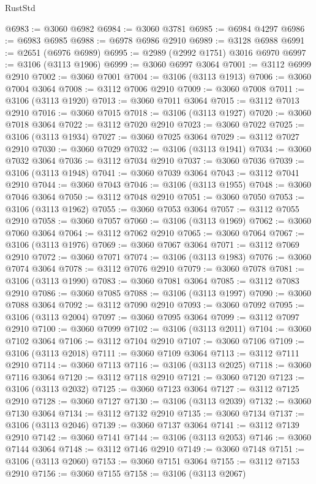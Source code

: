 \begin{lexlean}{RustStd}
\begin{coremodule}
@6983 := @3060 @6982
@6984 := @3060 @3781
@6985 := @6984 @4297
@6986 := @6983 @6985
@6988 := @6978 @6986 @2910
@6989 := @3128 @6988
@6991 := @2651 (@6976 @6989)
@6995 := @2989 (@2992 @1751) @3016 @6970
@6997 := @3106 (@3113 @1906)
@6999 := @3060 @6997 @3064
@7001 := @3112 @6999 @2910
@7002 := @3060 @7001
@7004 := @3106 (@3113 @1913)
@7006 := @3060 @7004 @3064
@7008 := @3112 @7006 @2910
@7009 := @3060 @7008
@7011 := @3106 (@3113 @1920)
@7013 := @3060 @7011 @3064
@7015 := @3112 @7013 @2910
@7016 := @3060 @7015
@7018 := @3106 (@3113 @1927)
@7020 := @3060 @7018 @3064
@7022 := @3112 @7020 @2910
@7023 := @3060 @7022
@7025 := @3106 (@3113 @1934)
@7027 := @3060 @7025 @3064
@7029 := @3112 @7027 @2910
@7030 := @3060 @7029
@7032 := @3106 (@3113 @1941)
@7034 := @3060 @7032 @3064
@7036 := @3112 @7034 @2910
@7037 := @3060 @7036
@7039 := @3106 (@3113 @1948)
@7041 := @3060 @7039 @3064
@7043 := @3112 @7041 @2910
@7044 := @3060 @7043
@7046 := @3106 (@3113 @1955)
@7048 := @3060 @7046 @3064
@7050 := @3112 @7048 @2910
@7051 := @3060 @7050
@7053 := @3106 (@3113 @1962)
@7055 := @3060 @7053 @3064
@7057 := @3112 @7055 @2910
@7058 := @3060 @7057
@7060 := @3106 (@3113 @1969)
@7062 := @3060 @7060 @3064
@7064 := @3112 @7062 @2910
@7065 := @3060 @7064
@7067 := @3106 (@3113 @1976)
@7069 := @3060 @7067 @3064
@7071 := @3112 @7069 @2910
@7072 := @3060 @7071
@7074 := @3106 (@3113 @1983)
@7076 := @3060 @7074 @3064
@7078 := @3112 @7076 @2910
@7079 := @3060 @7078
@7081 := @3106 (@3113 @1990)
@7083 := @3060 @7081 @3064
@7085 := @3112 @7083 @2910
@7086 := @3060 @7085
@7088 := @3106 (@3113 @1997)
@7090 := @3060 @7088 @3064
@7092 := @3112 @7090 @2910
@7093 := @3060 @7092
@7095 := @3106 (@3113 @2004)
@7097 := @3060 @7095 @3064
@7099 := @3112 @7097 @2910
@7100 := @3060 @7099
@7102 := @3106 (@3113 @2011)
@7104 := @3060 @7102 @3064
@7106 := @3112 @7104 @2910
@7107 := @3060 @7106
@7109 := @3106 (@3113 @2018)
@7111 := @3060 @7109 @3064
@7113 := @3112 @7111 @2910
@7114 := @3060 @7113
@7116 := @3106 (@3113 @2025)
@7118 := @3060 @7116 @3064
@7120 := @3112 @7118 @2910
@7121 := @3060 @7120
@7123 := @3106 (@3113 @2032)
@7125 := @3060 @7123 @3064
@7127 := @3112 @7125 @2910
@7128 := @3060 @7127
@7130 := @3106 (@3113 @2039)
@7132 := @3060 @7130 @3064
@7134 := @3112 @7132 @2910
@7135 := @3060 @7134
@7137 := @3106 (@3113 @2046)
@7139 := @3060 @7137 @3064
@7141 := @3112 @7139 @2910
@7142 := @3060 @7141
@7144 := @3106 (@3113 @2053)
@7146 := @3060 @7144 @3064
@7148 := @3112 @7146 @2910
@7149 := @3060 @7148
@7151 := @3106 (@3113 @2060)
@7153 := @3060 @7151 @3064
@7155 := @3112 @7153 @2910
@7156 := @3060 @7155
@7158 := @3106 (@3113 @2067)

\end{coremodule}
\end{lexlean}
